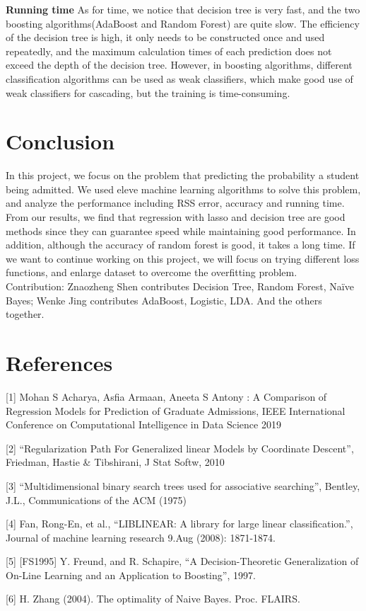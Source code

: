 \documentclass{article}
\begin{document}
\textbf{Running time}
As for time, we notice that decision tree is very fast, and the two boosting algorithms(AdaBoost and Random Forest) are quite slow. The efficiency of the decision tree is high, it only needs to be constructed once and used repeatedly, and the maximum calculation times of each prediction does not exceed the depth of the decision tree. However, in boosting algorithms, different classification algorithms can be used as weak classifiers, which make good use of weak classifiers for cascading, but the training is time-consuming.



\section{Conclusion}
In this project, we focus on the problem that predicting the probability a student being admitted. We used eleve machine learning algorithms to solve this problem, and analyze the performance including RSS error, accuracy and running time. From our results, we find that regression with lasso and decision tree are good methods since they can guarantee speed while maintaining good performance. In addition, although the accuracy of random forest is good, it takes a long time. If we want to continue working on this project, we will focus on trying different loss functions, and enlarge dataset to overcome the overfitting problem.\\
Contribution: Znaozheng Shen contributes Decision Tree, Random Forest, Naïve Bayes; Wenke Jing contributes AdaBoost, Logistic, LDA. And the others together.
\section*{References}


\small
[1] Mohan S Acharya, Asfia Armaan, Aneeta S Antony : A Comparison of Regression Models for Prediction of Graduate Admissions, IEEE International Conference on Computational Intelligence in Data Science 2019

[2] “Regularization Path For Generalized linear Models by Coordinate Descent”, Friedman, Hastie \& Tibshirani, J Stat Softw, 2010

[3]  “Multidimensional binary search trees used for associative searching”, Bentley, J.L., Communications of the ACM (1975)

[4] Fan, Rong-En, et al., “LIBLINEAR: A library for large linear classification.”, Journal of machine learning research 9.Aug (2008): 1871-1874.

[5] [FS1995] Y. Freund, and R. Schapire, “A Decision-Theoretic Generalization of On-Line Learning and an Application to Boosting”, 1997.

[6] H. Zhang (2004). The optimality of Naive Bayes. Proc. FLAIRS.
\end{document}
